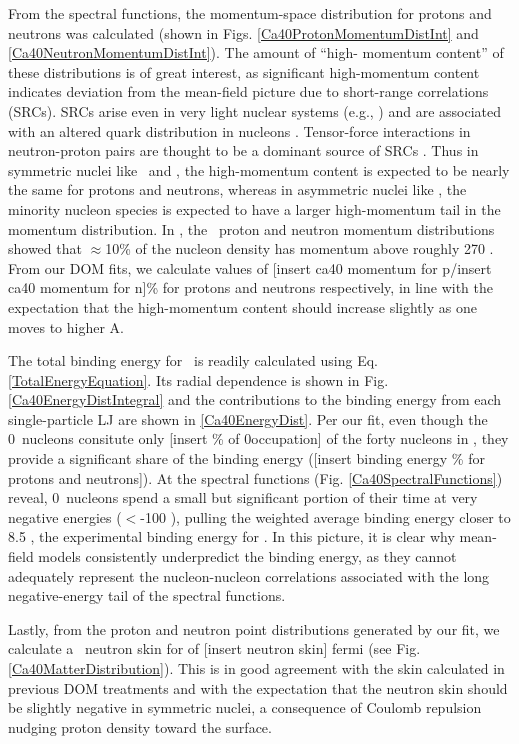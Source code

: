 From the spectral functions, the momentum-space distribution for protons and neutrons was
calculated (shown in Figs. \ref{Ca40ProtonMomentumDistInt} and
\ref{Ca40NeutronMomentumDistInt}). The amount of ``high-
momentum content'' of these distributions is of great interest, as significant high-momentum content 
indicates deviation from the mean-field picture due to short-range correlations (SRCs). SRCs arise 
even in very light nuclear systems (e.g., \heFour)
and are associated with an altered quark distribution in nucleons 
\cite{Hen2012, Arrington2012, CLAS2019}.
Tensor-force interactions in neutron-proton pairs are thought to be a dominant source of 
SRCs \cite{Subedi2008}. Thus in symmetric nuclei like \cTwelve\ and \caForty, the
high-momentum content is expected to be nearly the same for protons and neutrons, whereas in
asymmetric nuclei like \pbEight, the minority nucleon species is expected to have a larger
high-momentum tail in the momentum distribution. In \cite{Rohe2004}, the \cTwelve\ proton and
neutron momentum distributions showed that $\approx$10\% of the nucleon density
has momentum above roughly 270 \mega\electronvolt{}.
From our DOM fits, we calculate values of [insert ca40 momentum for p/insert ca40 momentum for n]\%
for protons and neutrons respectively, in line with the expectation that the high-momentum content
should increase slightly as one moves to higher A.

The total binding energy for \caForty\ is readily calculated using Eq.
\ref{TotalEnergyEquation}. Its radial dependence is shown in Fig.
\ref{Ca40EnergyDistIntegral} and the
contributions to the binding energy from each single-particle LJ are shown in
\ref{Ca40EnergyDist}. Per our fit, even though the 0\sOne\ nucleons consitute only [insert \%
of 0\sOne occupation] of the forty nucleons in \caForty, they provide a significant
share of the binding
energy ([insert binding energy \% for protons and neutrons]). At the spectral
functions (Fig. \ref{Ca40SpectralFunctions}) reveal, 0\sOne\ nucleons spend a small but significant portion of their time 
at very negative energies ($<$-100 \mega\electronvolt), pulling the weighted average binding energy 
closer to 8.5 \mega\electronvolt{}, the experimental binding energy for \caForty. In this
picture, it is clear why mean-field models consistently underpredict the binding energy, as they
cannot adequately represent the nucleon-nucleon correlations associated with the long
negative-energy tail of the spectral functions.

Lastly, from the proton and neutron point distributions generated by our fit, we calculate a
\caForty\ neutron skin for of [insert neutron skin] fermi (see Fig. \ref{Ca40MatterDistribution}). 
This is in good agreement with the skin calculated in previous DOM treatments
\cite{MahzoonPhDThesis} and with the expectation that the neutron skin should be slightly negative in
symmetric nuclei, a consequence of Coulomb repulsion nudging proton density toward the surface.

